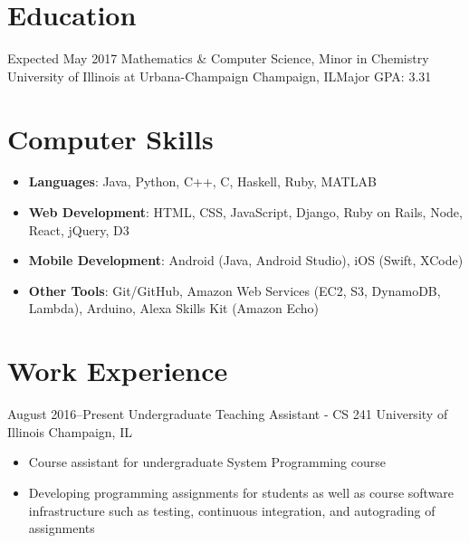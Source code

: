 \documentclass[10pt,a4paper,sans]{moderncv}        %
\begin{document}
\makecvtitle

\section{Education}

\vspace{6pt}
\cventry
{Expected May 2017}
{Mathematics \& Computer Science, Minor in Chemistry}
{University of Illinois at Urbana-Champaign}
{Champaign, IL}{}{Major GPA: 3.31}

\section{Computer Skills}
\vspace{5pt}
\begin{itemize}
  \vspace{3pt}
  \item
    \textbf{Languages}: Java, Python, C++, C, Haskell, Ruby, MATLAB
  \item
    \textbf{Web Development}: HTML, CSS, JavaScript, Django, Ruby on Rails, Node,
                              React, jQuery, D3
  \item
    \textbf{Mobile Development}: Android (Java, Android Studio), iOS (Swift, XCode)
  \item
    \textbf{Other Tools}: Git/GitHub, Amazon Web Services (EC2, S3, DynamoDB, Lambda),
    Arduino, Alexa Skills Kit (Amazon Echo)
\end{itemize}

\section{Work Experience}
\vspace{6pt}

\cventry
{August 2016--Present}
{\vspace{3pt}Undergraduate Teaching Assistant - CS 241}
{University of Illinois}
{Champaign, IL}{}
{
\begin{itemize}
  \item Course assistant for undergraduate System Programming course
  \item Developing programming assignments for students as well as course software
        infrastructure such as testing, continuous integration, and autograding of
        assignments
\end{itemize}}
\end{document}
